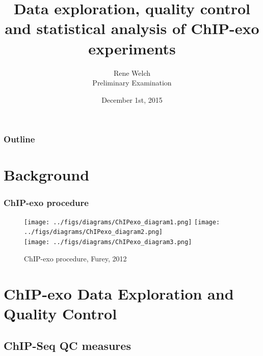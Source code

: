 \documentclass[compress,table,xcolor=dvipsnames]{beamer}\usepackage[]{graphicx}\usepackage[]{color}
\title[QC and analysis of ChIP-exo]{Data exploration, quality control
  and statistical analysis of ChIP-exo experiments}
\author{Rene Welch\\Preliminary Examination}
\institute[UW-STAT]{Department of Statistics\\University of Wisconsin - Madison}
\date{December 1st, 2015}
\begin{document}
\begin{frame}
  \maketitle
\end{frame}

\begin{frame}
\frametitle{Outline}
  \tableofcontents
\end{frame}

\section{Background}

\begin{frame}
\frametitle{ChIP-exo procedure}
  \begin{figure}[H]
    \centering
\texttt{[image: ../figs/diagrams/ChIPexo\_diagram1.png]}
\texttt{[image: ../figs/diagrams/ChIPexo\_diagram2.png]}\\
\texttt{[image: ../figs/diagrams/ChIPexo\_diagram3.png]}
    \caption{ChIP-exo procedure, Furey, 2012 \cite{chipbeyond}}
    \label{fig:exo_diagram}
  \end{figure}
\end{frame}

\section{ChIP-exo Data Exploration and Quality Control}

\subsection{ChIP-Seq QC measures}
\end{document}
